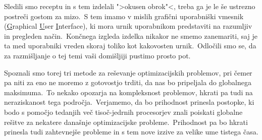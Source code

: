 \documentclass[a4paper]{article}
\begin{document}
Sledili smo receptu in s tem izdelali ">okusen obrok"<, treba ga je le še ustrezno postreči
gostom za mizo.\ S tem imamo v mislih grafični uporabniški vmesnik (\underline{G}raphical
\underline{U}ser \underline{I}nterface), ki mora urnik uporabnikom predstaviti na razumljiv in
pregleden način.\ Končnega izgleda izdelka nikakor ne smemo zanemariti, saj je ta med uporabniki
vreden skoraj toliko kot kakovosten urnik.\ Odločili smo se, da za razmišljanje o tej temi vaši
domišljiji pustimo prosto pot.

Spoznali smo torej tri metode za reševanje optimizacijskih problemov, pri čemer pa niti za eno
ne moremo z gotovostjo trditi, da nas bo pripeljala do globalnega maksimuma.\ To nekako opozarja
na kompleksnost problemov, hkrati pa tudi na neraziskanost tega področja.\ Verjamemo, da bo
prihodnost prinesla postopke, ki bodo s pomočjo tedanjih več tisoč-jedrnih procesorjev znali
poiskati globalne rešitve za nekatere današnje optimizacijske probleme.\ Prihodnost pa bo
hkrati prinesla tudi zahtevnejše probleme in s tem nove izzive za velike ume tistega časa.
\end{document}
